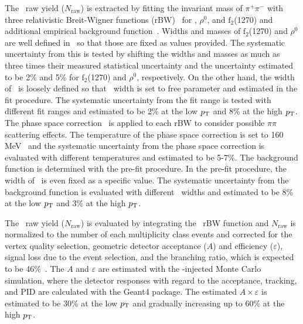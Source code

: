 \documentclass[ALICE,manyauthors]{cernphprep}
\begin{document}
The \fzero~raw yield ($N_{\mathrm{raw}}$) is extracted by fitting the invariant mass of $\pi^{+}\pi^{-}$ with three relativistic Breit-Wigner functions (rBW)~\cite{ALICE:2015nbw} for \fzero, $\rho^{0}$, and $\mathrm{f}_{2}$(1270) and additional empirical background function~\cite{OPAL:1998enc}. Widths and masses of $\mathrm{f}_{2}$(1270) and $\rho^{0}$ are well defined in~\cite{ParticleDataGroup:2020ssz} so that those are fixed as values provided. The systematic uncertainty from this is tested by shifting the widths and masses as much as three times their measured statistical uncertainty and the uncertainty estimated to be 2\% and 5\% for $\mathrm{f}_{2}$(1270) and $\rho^{0}$, respectively. On the other hand, the width of \fzero~is loosely defined so that \fzero~width is set to free parameter and estimated in the fit procedure. The systematic uncertainty from the fit range is tested with different fit ranges and estimated to be 2\% at the low $p_{\rm{T}}$ and 8\% at the high $p_{\rm{T}}$. The phase space correction~\cite{Rapp:2003ar} is applied to each rBW to consider possible $\pi\pi$ scattering effects. The temperature of the phase space correction is set to 160 MeV~\cite{ALICE:2013wgn} and the systematic uncertainty from the phase space correction is evaluated with different temperatures and estimated to be 5-7\%. The background function is determined with the pre-fit procedure. In the pre-fit procedure, the width of \fzero~is even fixed as a specific value. The systematic uncertainty from the background function is evaluated with different \fzero~widths and estimated to be 8\% at the low $p_{\rm{T}}$ and 3\% at the high $p_{\rm{T}}$.

The \fzero~raw yield ($N_{\mathrm{raw}}$) is evaluated by integrating the \fzero~rBW function and $N_{\mathrm{raw}}$ is normalized to the number of each multiplicity class events and corrected for the vertex quality selection, geometric detector acceptance ($A$) and efficiency ($\varepsilon$), signal loss due to the event selection, and the branching ratio, which is expected to be 46\%~\cite{Stone:2013eaa}. The $A$ and $\varepsilon$ are estimated with the \fzero-injected Monte Carlo simulation, where the detector responses with regard to the acceptance, tracking, and PID are calculated with the Geant4 package. The estimated $A \times \varepsilon$ is estimated to be 30\% at the low $p_{\rm{T}}$ and gradually increasing up to 60\% at the high $p_{\rm{T}}$.
\end{document}
